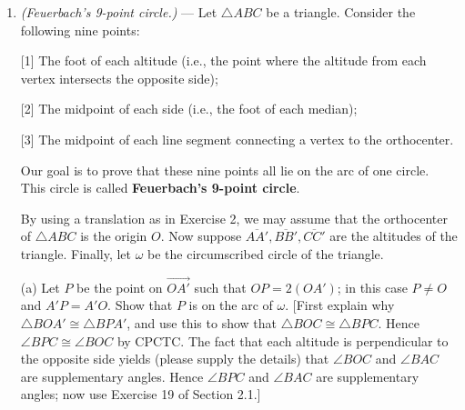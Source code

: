 \documentclass[leqno]{book}
\begin{document}
\begin{enumerate}
(b) Show that the orthocenter of $\triangle ABC$ is $\left(x_1+x_2+x_3,y_1+y_2+y_3\right)$.  [Let $P=\left(x_1+x_2+x_3,y_1+y_2+y_3\right)$.  Then $\overset{\longleftrightarrow}{AP}$ is given by the equation $(y_2+y_3)x-(x_2+x_3)y=(y_2+y_3)x_1-(x_2+x_3)y_1$.  Also, verify that $\overset{\longleftrightarrow}{BC}$ is the line $(y_3-y_2)x-(x_3-x_2)y=y_3x_2-x_3y_2$.  Now let $\ell_1$ be the line $(y_2+y_3)x-(x_2+x_3)y=0$ and $\ell_2$ the line $(y_3-y_2)x-(x_3-x_2)y=0$; these are lines through the origin parallel to $\overset{\longleftrightarrow}{AP}$ and $\overset{\longleftrightarrow}{BC}$ respectively.  If $R=(x_2+x_3,y_2+y_3)$ and $S=(x_3-x_2,y_3-y_2)$, observe that $R\in\ell_1,S\in\ell_2$; then use Proposition 2.27 to show that $\angle ROS$ is a right angle.  Conclude that $\ell_1\perp\ell_2$, and hence $\overline{AP}\perp\overline{BC}$ and $P$ is on the altitude from $A$.]

(c) Conclude that if $O$ is the circumcenter, $E$ the centroid and $H$ the orthocenter, then $O,E,H$ all lie on one line, and $OE=\frac 12(EH)$.

\item\emph{(Feuerbach's 9-point circle.)} \---- Let $\triangle ABC$ be a triangle.  Consider the following nine points:

[1] The foot of each altitude (i.e., the point where the altitude from each vertex intersects the opposite side);

[2] The midpoint of each side (i.e., the foot of each median);

[3] The midpoint of each line segment connecting a vertex to the orthocenter.

Our goal is to prove that these nine points all lie on the arc of one circle.  This circle is called \textbf{Feuerbach's 9-point circle}.

By using a translation as in Exercise 2, we may assume that the orthocenter of $\triangle ABC$ is the origin $O$.  Now suppose $\overline{AA'},\overline{BB'},\overline{CC'}$ are the altitudes of the triangle.  Finally, let $\omega$ be the circumscribed circle of the triangle.

(a) Let $P$ be the point on $\overset{\longrightarrow}{OA'}$ such that $OP=2(OA')$; in this case $P\ne O$ and $A'P=A'O$.  Show that $P$ is on the arc of $\omega$.  [First explain why $\triangle BOA'\cong\triangle BPA'$, and use this to show that $\triangle BOC\cong\triangle BPC$.  Hence $\angle BPC\cong\angle BOC$ by CPCTC.  The fact that each altitude is perpendicular to the opposite side yields (please supply the details) that $\angle BOC$ and $\angle BAC$ are supplementary angles.  Hence $\angle BPC$ and $\angle BAC$ are supplementary angles; now use Exercise 19 of Section 2.1.]


\end{enumerate}
\end{document}
